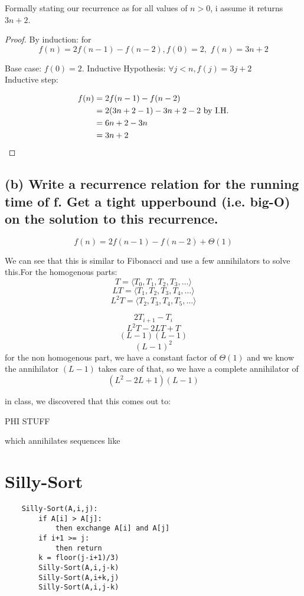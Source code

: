 \documentclass[titlepage]{article}\usepackage[]{graphicx}\usepackage[]{color}
\begin{document}
Formally stating our recurrence as 
for all values of $n > 0$,  i assume it returns $3n+2$. 
\begin{proof} By induction: for 
\[ f(n) = 2f(n-1) - f(n-2) , f(0) = 2,\,\, f(n) = 3n +2 \]

Base case: $f(0) = 2$.  
Inductive Hypothesis: $\forall j < n, f(j) = 3j + 2 $ \\
Inductive step: 

\begin{align*}
	f(n) &= 2f(n-1) - f(n-2) \\
	&= 2(3n + 2 -1) - 3n+2-2 \text{ by I.H.} \\
	&= 6n + 2 - 3n \\
	&= 3n + 2 \qedhere
\end{align*}
\end{proof}


\subsection{(b) Write a recurrence relation for the running time of f. Get a tight
upperbound (i.e. big-O) on the solution to this recurrence.}

\[ f(n) = 2f(n-1) - f(n-2) + \Theta(1) \]

We can see that this is similar to Fibonacci and use a few annihilators to
solve this.For the homogenous parts:
\[ T = \langle T_0, T_1, T_2, T_3, \ldots \rangle \]
\[ LT = \langle T_1, T_2, T_3, T_4, \ldots \rangle \]
\[ L^2T = \langle T_2, T_3, T_4, T_5, \ldots \rangle \]

\[ 2T_{i+1} - T_i \]
\[L^2T - 2LT + T \]
\[ (L-1)(L-1) \]
\[ (L-1)^2 \]
for the non homogenous part, we have a constant factor of $\Theta(1) $ and we
know the annihilator $(L-1)$ takes care of that, so we have a complete
annihilator of 
\[ (L^2 - 2L + 1)(L-1) \]





in class, we discovered that this comes out to: 

PHI STUFF

which annihilates sequences like 




\section{Silly-Sort }
\begin{lstlisting}
	Silly-Sort(A,i,j):
		if A[i] > A[j]:
			then exchange A[i] and A[j]
		if i+1 >= j:
			then return
		k = floor(j-i+1)/3)
		Silly-Sort(A,i,j-k)
		Silly-Sort(A,i+k,j)
		Silly-Sort(A,i,j-k)
	
\end{lstlisting}
\end{document}
